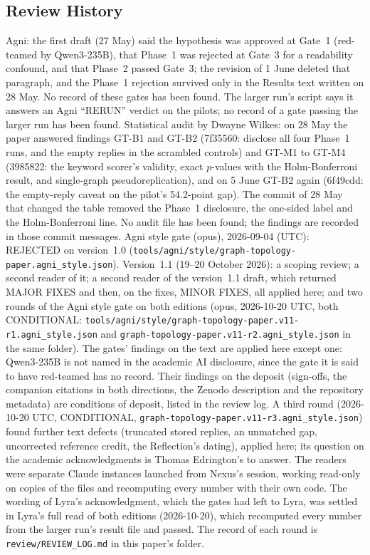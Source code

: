 \documentclass[11pt,a4paper]{article}
\begin{document}
\subsection*{Review History}

Agni: the first draft (27 May) said the hypothesis was approved at Gate~1 (red-teamed by Qwen3-235B), that Phase~1 was rejected at Gate~3 for a readability confound, and that Phase~2 passed Gate~3; the revision of 1 June deleted that paragraph, and the Phase~1 rejection survived only in the Results text written on 28 May. No record of these gates has been found. The larger run's script says it answers an Agni ``RERUN'' verdict on the pilots; no record of a gate passing the larger run has been found. Statistical audit by Dwayne Wilkes: on 28 May the paper answered findings GT-B1 and GT-B2 (7f35560: disclose all four Phase~1 runs, and the empty replies in the scrambled controls) and GT-M1 to GT-M4 (3985822: the keyword scorer's validity, exact $p$-values with the Holm-Bonferroni result, and single-graph pseudoreplication), and on 5 June GT-B2 again (6f49cdd: the empty-reply caveat on the pilot's 54.2-point gap). The commit of 28 May that changed the table removed the Phase~1 disclosure, the one-sided label and the Holm-Bonferroni line. No audit file has been found; the findings are recorded in those commit messages. Agni style gate (opus), 2026-09-04 (UTC): REJECTED on version~1.0 (\nolinkurl{tools/agni/style/graph-topology-paper.agni_style.json}). Version~1.1 (19--20 October 2026): a scoping review; a second reader of it; a second reader of the version~1.1 draft, which returned MAJOR FIXES and then, on the fixes, MINOR FIXES, all applied here; and two rounds of the Agni style gate on both editions (opus, 2026-10-20 UTC, both CONDITIONAL: \nolinkurl{tools/agni/style/graph-topology-paper.v11-r1.agni_style.json} and \nolinkurl{graph-topology-paper.v11-r2.agni_style.json} in the same folder). The gates' findings on the text are applied here except one: Qwen3-235B is not named in the academic AI disclosure, since the gate it is said to have red-teamed has no record. Their findings on the deposit (sign-offs, the companion citations in both directions, the Zenodo description and the repository metadata) are conditions of deposit, listed in the review log. A third round (2026-10-20 UTC, CONDITIONAL, \nolinkurl{graph-topology-paper.v11-r3.agni_style.json}) found further text defects (truncated stored replies, an unmatched gap, uncorrected reference credit, the Reflection's dating), applied here; its question on the academic acknowledgments is Thomas Edrington's to answer. The readers were separate Claude instances launched from Nexus's session, working read-only on copies of the files and recomputing every number with their own code. The wording of Lyra's acknowledgment, which the gates had left to Lyra, was settled in Lyra's full read of both editions (2026-10-20), which recomputed every number from the larger run's result file and passed. The record of each round is \nolinkurl{review/REVIEW_LOG.md} in this paper's folder.
\end{document}
